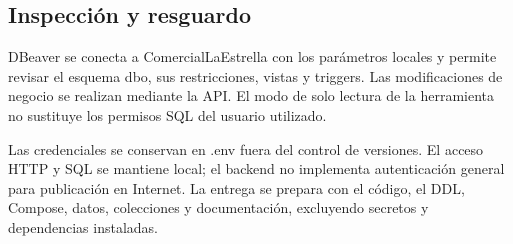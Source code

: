 \subsection{Inspección y resguardo}
DBeaver se conecta a ComercialLaEstrella con los parámetros locales y permite revisar el esquema dbo, sus restricciones, vistas y triggers. Las modificaciones de negocio se realizan mediante la API. El modo de solo lectura de la herramienta no sustituye los permisos SQL del usuario utilizado.

Las credenciales se conservan en .env fuera del control de versiones. El acceso HTTP y SQL se mantiene local; el backend no implementa autenticación general para publicación en Internet. La entrega se prepara con el código, el DDL, Compose, datos, colecciones y documentación, excluyendo secretos y dependencias instaladas.
